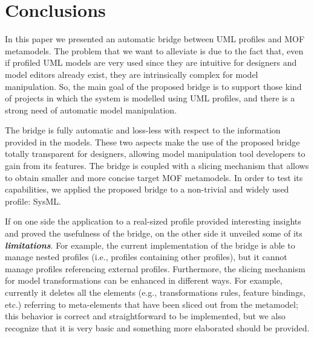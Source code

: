 \section{Conclusions}\label{sec:conclusion}
In this paper we presented an automatic bridge between UML profiles and MOF metamodels.
The problem that we want to alleviate is due to the fact that, even if profiled UML models are very used since they are intuitive for designers and model editors already exist, 
they are intrinsically complex for model manipulation.
So, the main goal of the proposed bridge is to support those kind of projects in which the system is modelled using UML profiles, and there is a strong need of automatic model manipulation.

The bridge is fully automatic and
loss-less with respect to the information provided in the models. 
These two aspects make the use of the proposed bridge totally transparent for designers, allowing
model manipulation tool developers to gain from its features. The bridge is coupled with a slicing mechanism
that allows to obtain smaller and more concise target MOF metamodels.
In order to test its capabilities, we applied the proposed bridge to a non-trivial and widely used profile:
SysML. 

If on one side the application to a real-sized profile provided interesting insights and proved the usefulness of the bridge, on the other side it unveiled some of its \textbf{\textit{limitations}}.
For example, the current implementation of the bridge is able to manage nested profiles (i.e., profiles containing other profiles), but it
cannot manage profiles referencing external profiles.
Furthermore, the slicing mechanism for model transformations can be enhanced in different ways. For example, currently it deletes all the
elements (e.g., transformations rules, feature bindings, etc.) referring to meta-elements that have been sliced out from the metamodel;
this behavior is correct and straightforward to be implemented, but we also recognize that it is very basic and something more elaborated should
be provided. 

